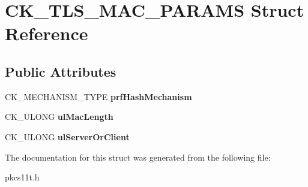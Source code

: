 \hypertarget{struct_c_k___t_l_s___m_a_c___p_a_r_a_m_s}{}\section{C\+K\+\_\+\+T\+L\+S\+\_\+\+M\+A\+C\+\_\+\+P\+A\+R\+A\+MS Struct Reference}
\label{struct_c_k___t_l_s___m_a_c___p_a_r_a_m_s}
\subsection*{Public Attributes}
\begin{DoxyCompactItemize}
\item 
\mbox{\label{struct_c_k___t_l_s___m_a_c___p_a_r_a_m_s_ab1f82ced652eac930c3d3c930a9825f2}} 
C\+K\+\_\+\+M\+E\+C\+H\+A\+N\+I\+S\+M\+\_\+\+T\+Y\+PE {\bfseries prf\+Hash\+Mechanism}
\item 
\mbox{\label{struct_c_k___t_l_s___m_a_c___p_a_r_a_m_s_ab81041349514911306fbed80af4b26fe}} 
C\+K\+\_\+\+U\+L\+O\+NG {\bfseries ul\+Mac\+Length}
\item 
\mbox{\label{struct_c_k___t_l_s___m_a_c___p_a_r_a_m_s_aab6e29179b6c8106b037587a26764edd}} 
C\+K\+\_\+\+U\+L\+O\+NG {\bfseries ul\+Server\+Or\+Client}
\end{DoxyCompactItemize}


The documentation for this struct was generated from the following file\+:\begin{DoxyCompactItemize}
\item 
pkcs11t.\+h\end{DoxyCompactItemize}
